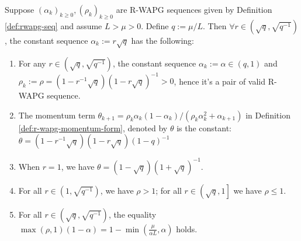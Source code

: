 \documentclass[12pt]{article}
\begin{document}
    \begin{lemma}\label{lemma:constant-rwapg-seq}
        Suppose $(\alpha_k)_{k \ge 0}, (\rho_k)_{k \ge 0}$ are R-WAPG sequences given by Definition \ref{def:rwapg-seq} and assume $L > \mu > 0$.
        Define $q := \mu/L$.
        Then $\forall r \in \left(\sqrt{q},\sqrt{q^{-1}}\right)$, the constant sequence $\alpha_k := r \sqrt{q}$ has the following:
        \begin{enumerate}
            \item For any $r \in \left(\sqrt{q}, \sqrt{q^{-1}}\right)$, the constant sequence $\alpha_k := \alpha \in (q, 1)$ and\\
            $\rho_k := \rho=\left(1-r^{-1}\sqrt{q}\right)\left(1 - r \sqrt{q}\right)^{-1} > 0$, hence it's a pair of valid R-WAPG sequence.
            \item The momentum term $\theta_{k + 1}=\rho_k\alpha_k(1 - \alpha_k)/(\rho_k\alpha_k^2 + \alpha_{k + 1})$ in Definition \ref{def:r-wapg-momentum-form}, denoted by $\theta$ is the constant: $\theta = (1 - r^{-1}\sqrt{q})(1 - r\sqrt{q})(1- q)^{-1}$
            \item When $r = 1$, we have $\theta = (1- \sqrt{q})(1 + \sqrt{q})^{-1}$.
            \item For all $r \in \left(1, \sqrt{q^{-1}}\right)$, we have $\rho > 1$; for all $r \in \left(\sqrt{q}, 1\right]$ we have $\rho \le 1$.
            \item For all $r \in \left(\sqrt{q}, \sqrt{q^{-1}}\right)$, the equality $\max(\rho, 1)(1 - \alpha) = 1 - \min\left(\frac{\mu}{\alpha L}, \alpha\right)$ holds.
        \end{enumerate}
    \end{lemma}
\end{document}
